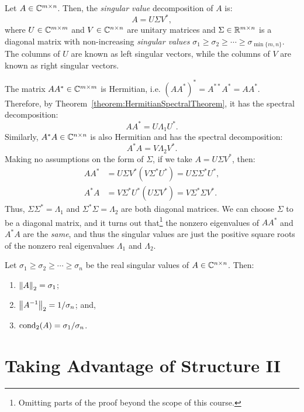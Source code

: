 \begin{theorem}
Let $A\in\mathbb{C}^{m\times n}$. Then, the {\em singular value} decomposition of $A$ is:
\[
A = U\Sigma V^*,
\]
where $U\in\mathbb{C}^{m\times m}$ and $V\in\mathbb{C}^{n\times n}$ are unitary matrices and $\Sigma\in\mathbb{R}^{m\times n}$ is a diagonal matrix with non-increasing {\em singular values} $\sigma_1\ge\sigma_2\ge\cdots\ge\sigma_{\min\{m,n\}}$. The columns of $U$ are known as left singular vectors, while the columns of $V$ are known as right singular vectors.
\end{theorem}
\begin{proofsketch}
The matrix $AA^*\in\mathbb{C}^{m\times m}$ is Hermitian, i.e. $(AA^*)^* = A^{**}A^* = AA^*$. Therefore, by Theorem~\ref{theorem:HermitianSpectralTheorem}, it has the spectral decomposition:
\[
AA^* = U\Lambda_1 U^*.
\]
Similarly, $A^*A\in\mathbb{C}^{n\times n}$ is also Hermitian and has the spectral decomposition:
\[
A^*A = V\Lambda_2 V^*.
\]
Making no assumptions on the form of $\Sigma$, if we take $A=U\Sigma V^*$, then:
\begin{align*}
AA^* & = U\Sigma V^* (V\Sigma^*U^*) = U\Sigma\Sigma^* U^*,\\
A^*A & = V\Sigma^* U^* (U\Sigma V^*) = V\Sigma^*\Sigma V^*.
\end{align*}
Thus, $\Sigma\Sigma^* = \Lambda_1$ and $\Sigma^*\Sigma = \Lambda_2$ are both diagonal matrices. We can choose $\Sigma$ to be a diagonal matrix, and it turns out that\footnote{Omitting parts of the proof beyond the scope of this course.} the nonzero eigenvalues of $AA^*$ and $A^*A$ are the {\em same}, and thus the singular values are just the positive square roots of the nonzero real eigenvalues $\Lambda_1$ and $\Lambda_2$.
\end{proofsketch}

\begin{theorem}\label{theorem:SVD2normcond}
Let $\sigma_1\ge\sigma_2\ge\cdots\ge\sigma_n$ be the real singular values of $A\in\mathbb{C}^{n\times n}$. Then:
\begin{enumerate}
\item $\left\|{A}\right\|_2 = \sigma_1$;
\item $\displaystyle \left\|{A^{-1}}\right\|_2 = 1/\sigma_n$; and,
\item $\displaystyle \operatorname{cond}_2(A) = \sigma_1/\sigma_n$.
\end{enumerate}
\end{theorem}

\section{Taking Advantage of Structure II}

